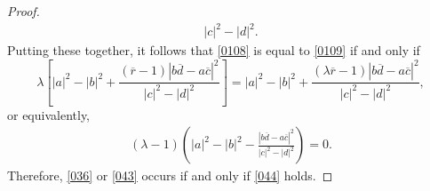 \documentclass[10pt,a4paper]{amsart}
\begin{document}
\begin{proof}
\begin{align}
{}{|c|^{2}-|d|^{2}}.
\end{align}
Putting these together, it follows that \eqref{0108} is equal to \eqref{0109} if and only if
\[
\lambda\left[  |a|^{2}-|b|^{2}+\frac{(\overline{r}-1)|b\overline{d}%
-a\overline{c}|^{2}}{|c|^{2}-|d|^{2}}\right]  =|a|^{2}-|b|^{2}+\frac
{(\lambda\overline{r}-1)|b\overline{d}-a\overline{c}|^{2}}{|c|^{2}-|d|^{2}},
\]
or equivalently,
\begin{align}\label{044}
(\lambda-1)\left(  |a|^{2}-|b|^{2}-\frac{|b\overline{d}-a\overline{c}|^{2}%
}{|c|^{2}-|d|^{2}}\right)  =0.
\end{align}
Therefore, \eqref{036} or \eqref{043} occurs if and only if \eqref{044} holds.
\end{proof}
\end{document}
